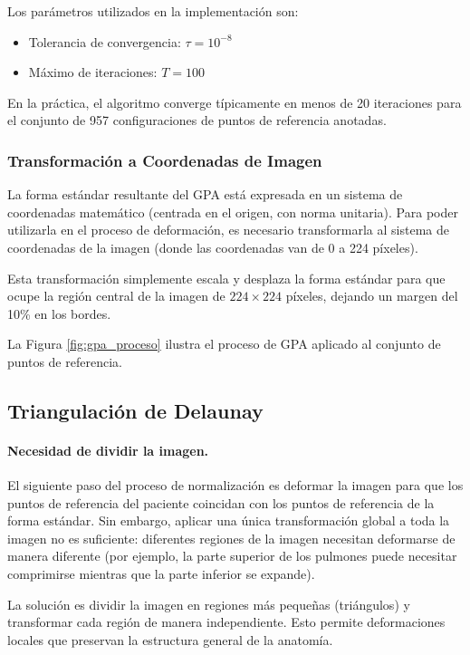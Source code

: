 Los parámetros utilizados en la implementación son:
\begin{itemize}
    \item Tolerancia de convergencia: $\tau = 10^{-8}$
    \item Máximo de iteraciones: $T = 100$
\end{itemize}

En la práctica, el algoritmo converge típicamente en menos de 20 iteraciones para el conjunto de 957 configuraciones de puntos de referencia anotadas.

\subsubsection{Transformación a Coordenadas de Imagen}

La forma estándar resultante del GPA está expresada en un sistema de coordenadas matemático (centrada en el origen, con norma unitaria). Para poder utilizarla en el proceso de deformación, es necesario transformarla al sistema de coordenadas de la imagen (donde las coordenadas van de 0 a 224 píxeles).

Esta transformación simplemente escala y desplaza la forma estándar para que ocupe la región central de la imagen de $224 \times 224$ píxeles, dejando un margen del 10\% en los bordes.

La Figura \ref{fig:gpa_proceso} ilustra el proceso de GPA aplicado al conjunto de puntos de referencia.


\subsection{Triangulación de Delaunay}
\label{subsec:triangulacion_delaunay}

\paragraph{Necesidad de dividir la imagen.}
El siguiente paso del proceso de normalización es deformar la imagen para que los puntos de referencia del paciente coincidan con los puntos de referencia de la forma estándar. Sin embargo, aplicar una única transformación global a toda la imagen no es suficiente: diferentes regiones de la imagen necesitan deformarse de manera diferente (por ejemplo, la parte superior de los pulmones puede necesitar comprimirse mientras que la parte inferior se expande).

La solución es dividir la imagen en regiones más pequeñas (triángulos) y transformar cada región de manera independiente. Esto permite deformaciones locales que preservan la estructura general de la anatomía.

